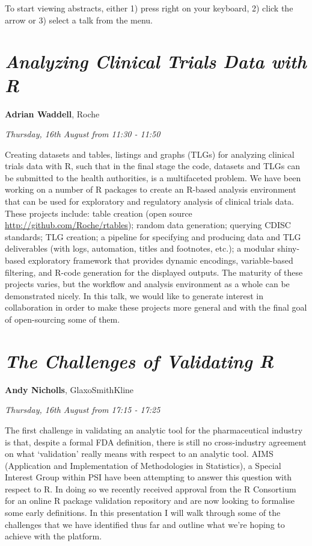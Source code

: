 \documentclass[]{book}
\theoremstyle{definition}
\theoremstyle{definition}
\theoremstyle{definition}
\theoremstyle{remark}
\begin{document}
To start viewing abstracts, either 1) press right on your keyboard, 2)
click the arrow or 3) select a talk from the menu.

\hypertarget{analyzing-clinical-trials-data-with-r}{%
\section{\texorpdfstring{\emph{Analyzing Clinical Trials Data with
R}}{Analyzing Clinical Trials Data with R}}\label{analyzing-clinical-trials-data-with-r}}

\textbf{Adrian Waddell}, Roche

\emph{Thursday, 16th August from 11:30 - 11:50}

Creating datasets and tables, listings and graphs (TLGs) for analyzing
clinical trials data with R, such that in the final stage the code,
datasets and TLGs can be submitted to the health authorities, is a
multifaceted problem. We have been working on a number of R packages to
create an R-based analysis environment that can be used for exploratory
and regulatory analysis of clinical trials data. These projects include:
table creation (open source \url{http://github.com/Roche/rtables});
random data generation; querying CDISC standards; TLG creation; a
pipeline for specifying and producing data and TLG deliverables (with
logs, automation, titles and footnotes, etc.); a modular shiny-based
exploratory framework that provides dynamic encodings, variable-based
filtering, and R-code generation for the displayed outputs. The maturity
of these projects varies, but the workflow and analysis environment as a
whole can be demonstrated nicely. In this talk, we would like to
generate interest in collaboration in order to make these projects more
general and with the final goal of open-sourcing some of them.

\hypertarget{the-challenges-of-validating-r}{%
\section{\texorpdfstring{\emph{The Challenges of Validating
R}}{The Challenges of Validating R}}\label{the-challenges-of-validating-r}}

\textbf{Andy Nicholls}, GlaxoSmithKline

\emph{Thursday, 16th August from 17:15 - 17:25}

The first challenge in validating an analytic tool for the
pharmaceutical industry is that, despite a formal FDA definition, there
is still no cross-industry agreement on what `validation' really means
with respect to an analytic tool. AIMS (Application and Implementation
of Methodologies in Statistics), a Special Interest Group within PSI
have been attempting to answer this question with respect to R. In doing
so we recently received approval from the R Consortium for an online R
package validation repository and are now looking to formalise some
early definitions. In this presentation I will walk through some of the
challenges that we have identified thus far and outline what we're
hoping to achieve with the platform.
\end{document}

